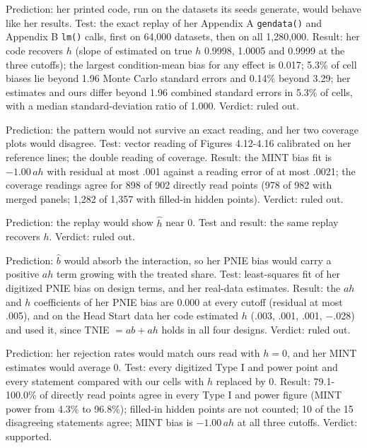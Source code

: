 \begin{description}[leftmargin=1em,style=nextline]
\item[Our implementation loses $h$ (ours).] Prediction: her printed code, run on the datasets its seeds generate, would behave like her results. Test: the exact replay of her Appendix A \texttt{gendata()} and Appendix B \texttt{lm()} calls, first on 64,000 datasets, then on all 1,280,000. Result: her code recovers $h$ (slope of estimated on true $h$ 0.9998, 1.0005 and 0.9999 at the three cutoffs); the largest condition-mean bias for any effect is 0.017; 5.3\% of cell biases lie beyond 1.96 Monte Carlo standard errors and 0.14\% beyond 3.29; her estimates and ours differ beyond 1.96 combined standard errors in 5.3\% of cells, with a median standard-deviation ratio of 1.000. Verdict: ruled out.
\item[We misread her figures (ours).] Prediction: the pattern would not survive an exact reading, and her two coverage plots would disagree. Test: vector reading of Figures 4.12-4.16 calibrated on her reference lines; the double reading of coverage. Result: the MINT bias fit is $-1.00\,ah$ with residual at most .001 against a reading error of at most .0021; the coverage readings agree for 898 of 902 directly read points (978 of 982 with merged panels; 1,282 of 1,357 with filled-in hidden points). Verdict: ruled out.
\item[Her printed code drops $h$ (source).] Prediction: the replay would show $\hat h$ near 0. Test and result: the same replay recovers $h$. Verdict: ruled out.
\item[Her fitted $y$ model omitted $tm$ (source).] Prediction: $\hat b$ would absorb the interaction, so her PNIE bias would carry a positive $ah$ term growing with the treated share. Test: least-squares fit of her digitized PNIE bias on design terms, and her real-data estimates. Result: the $ah$ and $h$ coefficients of her PNIE bias are 0.000 at every cutoff (residual at most .005), and on the Head Start data her code estimated $h$ (.003, .001, .001, $-$.028) and used it, since TNIE $= ab + ah$ holds in all four designs. Verdict: ruled out.
\item[The data behind her results had no interaction (source).] Prediction: her rejection rates would match ours read with $h = 0$, and her MINT estimates would average 0. Test: every digitized Type I and power point and every statement compared with our cells with $h$ replaced by 0. Result: 79.1-100.0\% of directly read points agree in every Type I and power figure (MINT power from 4.3\% to 96.8\%); filled-in hidden points are not counted; 10 of the 15 disagreeing statements agree; MINT bias is $-1.00\,ah$ at all three cutoffs. Verdict: supported.

\end{description}
